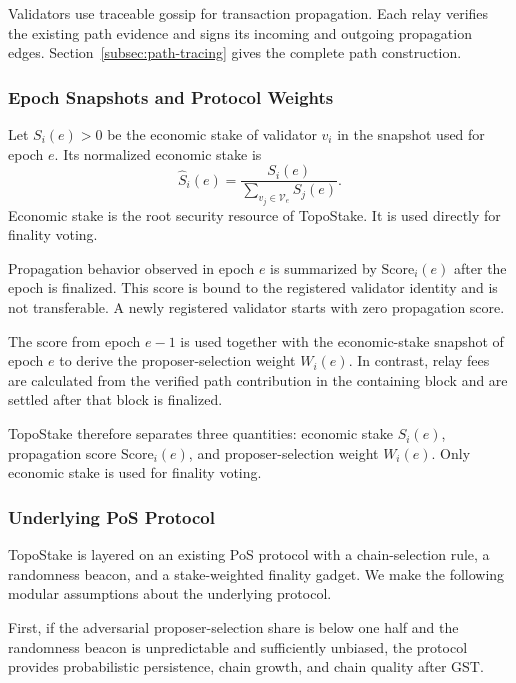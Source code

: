 \documentclass[lettersize,journal]{IEEEtran}
\begin{document}
Validators use traceable gossip for transaction propagation.
Each relay verifies the existing path evidence and signs its incoming and outgoing propagation edges.
Section~\ref{subsec:path-tracing} gives the complete path construction.

\subsubsection{Epoch Snapshots and Protocol Weights}

Let $S_i(e)>0$ be the economic stake of validator $v_i$ in the snapshot used for epoch $e$.
Its normalized economic stake is
\begin{equation}
\label{eq:normalized_economic_stake}
\hat S_i(e)
=
\frac{S_i(e)}
{\sum_{v_j\in\mathcal{V}_e}S_j(e)}.
\end{equation}
Economic stake is the root security resource of TopoStake.
It is used directly for finality voting.

Propagation behavior observed in epoch $e$ is summarized by
$\mathrm{Score}_i(e)$ after the epoch is finalized.
This score is bound to the registered validator identity and is not transferable.
A newly registered validator starts with zero propagation score.

The score from epoch $e-1$ is used together with the economic-stake snapshot of epoch $e$ to derive the proposer-selection weight $W_i(e)$.
In contrast, relay fees are calculated from the verified path contribution in the containing block and are settled after that block is finalized.

TopoStake therefore separates three quantities:
economic stake $\hat S_i(e)$, propagation score $\mathrm{Score}_i(e)$, and proposer-selection weight $W_i(e)$.
Only economic stake is used for finality voting.

\subsubsection{Underlying PoS Protocol}

TopoStake is layered on an existing PoS protocol with a chain-selection rule, a randomness beacon, and a stake-weighted finality gadget.
We make the following modular assumptions about the underlying protocol.

First, if the adversarial proposer-selection share is below one half and the randomness beacon is unpredictable and sufficiently unbiased, the protocol provides probabilistic persistence, chain growth, and chain quality after GST.
\end{document}
